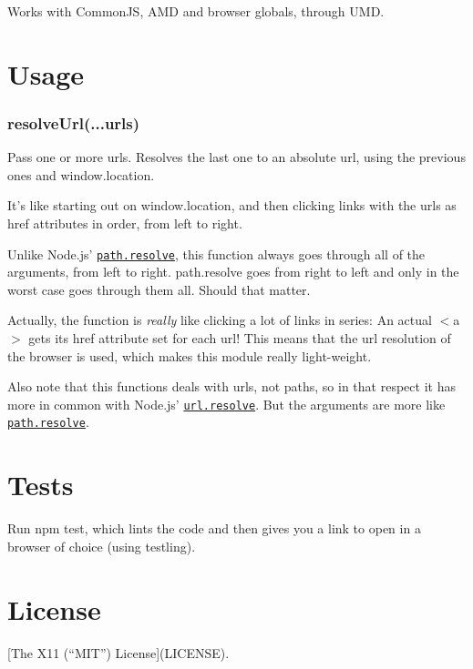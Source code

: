 Works with Common\+JS, A\+MD and browser globals, through U\+MD.

\section*{Usage }

\subsubsection*{{\ttfamily resolve\+Url(...urls)}}

Pass one or more urls. Resolves the last one to an absolute url, using the previous ones and {\ttfamily window.\+location}.

It’s like starting out on {\ttfamily window.\+location}, and then clicking links with the urls as {\ttfamily href} attributes in order, from left to right.

Unlike Node.\+js’ \href{http://nodejs.org/api/path.html#path_path_resolve_from_to}{\tt {\ttfamily path.\+resolve}}, this function always goes through all of the arguments, from left to right. {\ttfamily path.\+resolve} goes from right to left and only in the worst case goes through them all. Should that matter.

Actually, the function is {\itshape really} like clicking a lot of links in series\+: An actual {\ttfamily $<$a$>$} gets its {\ttfamily href} attribute set for each url! This means that the url resolution of the browser is used, which makes this module really light-\/weight.

Also note that this functions deals with urls, not paths, so in that respect it has more in common with Node.\+js’ \href{http://nodejs.org/api/url.html#url_url_resolve_from_to}{\tt {\ttfamily url.\+resolve}}. But the arguments are more like \href{http://nodejs.org/api/path.html#path_path_resolve_from_to}{\tt {\ttfamily path.\+resolve}}.

\section*{Tests }

Run {\ttfamily npm test}, which lints the code and then gives you a link to open in a browser of choice (using {\ttfamily testling}).

\section*{License }

\mbox{[}The X11 (“\+M\+I\+T”) License\mbox{]}(L\+I\+C\+E\+N\+SE). 